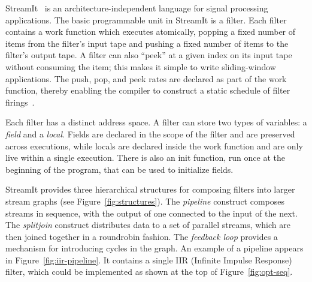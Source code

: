\label{sec:background}

StreamIt~\cite{streamitcc} is an architecture-independent language for
signal processing applications.  The basic programmable unit in
StreamIt is a filter.  Each filter contains a work function which
executes atomically, popping a fixed number of items from the filter's
input tape and pushing a fixed number of items to the filter's output
tape.  A filter can also ``peek'' at a given index on its input tape
without consuming the item; this makes it simple to write
sliding-window applications.  The push, pop, and peek rates are
declared as part of the work function, thereby enabling the compiler
to construct a static schedule of filter firings~\cite{lee87static}.

Each filter has a distinct address space.  A filter can store two
types of variables: a {\it field} and a {\it local}.  Fields are
declared in the scope of the filter and are preserved across
executions, while locals are declared inside the work function and are
only live within a single execution.  There is also an init function,
run once at the beginning of the program, that can be used to
initialize fields.

StreamIt provides three hierarchical structures for composing filters
into larger stream graphs (see Figure~\ref{fig:structures}).  The {\it
pipeline} construct composes streams in sequence, with the output of
one connected to the input of the next.  The {\it splitjoin} construct
distributes data to a set of parallel streams, which are then joined
together in a roundrobin fashion.  The {\it feedback loop} provides a
mechanism for introducing cycles in the graph.  An example of a
pipeline appears in Figure~\ref{fig:iir-pipeline}.  It contains a
single IIR (Infinite Impulse Response) filter, which could be
implemented as shown at the top of Figure~\ref{fig:opt-seq}.




